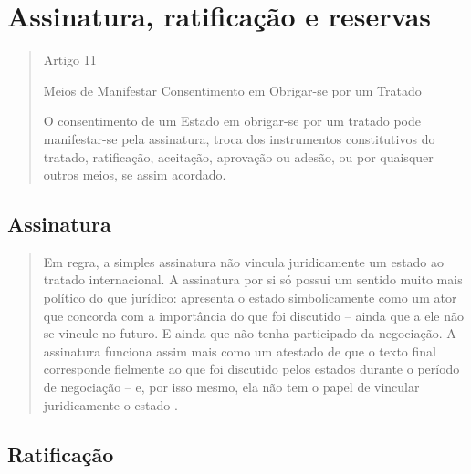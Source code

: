 \documentclass{article}
\begin{document}
\section{Assinatura, ratificação e reservas}

\begin{quote}
    \begin{center}
         Artigo 11

        Meios de Manifestar Consentimento em Obrigar-se por um Tratado
    \end{center}
    O consentimento de um Estado em obrigar-se por um tratado pode manifestar-se pela assinatura, troca dos instrumentos constitutivos do tratado, ratificação, aceitação, aprovação ou adesão, ou por quaisquer outros meios, se assim acordado.
    \cite{brasil_decreto_2009}
\end{quote}

\subsection{Assinatura}

\begin{quote}
    Em regra, a simples assinatura não vincula juridicamente um estado ao tratado internacional. A assinatura por si só possui um sentido muito mais político do que jurídico: apresenta o estado simbolicamente como um ator que concorda com a importância do que foi discutido – ainda que a ele não se vincule no futuro. E ainda que não tenha participado da negociação. A assinatura funciona assim mais como um atestado de que o texto final corresponde fielmente ao que foi discutido pelos estados durante o período de negociação – e, por isso mesmo, ela não tem o papel de vincular juridicamente o estado \cite[p.~159]{accioly_manual_2023}.
\end{quote}

\subsection{Ratificação}
\end{document}
